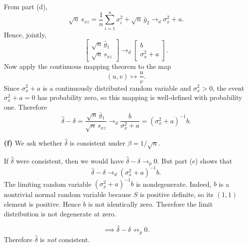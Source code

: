 \documentclass[12pt, letterpaper, onecolumn]{exam}
\begin{document}
\begin{solution}
    From part (d),
    $$
        \sqrt n\, s_{xz}
        =
        \frac1n\sum_{i=1}^n x_i^2+\sqrt n\,\bar g_2
        \to_d \sigma_x^2+a.
    $$
    Hence, jointly,
    $$
        \begin{bmatrix}
            \sqrt n\,\bar g_1 \\
            \sqrt n\, s_{xz}
        \end{bmatrix}
        \to_d
        \begin{bmatrix}
            b \\
            \sigma_x^2+a
        \end{bmatrix}.
    $$
    Now apply the continuous mapping theorem to the map
    $$
        (u,v)\mapsto \frac{u}{v}.
    $$
    Since \(\sigma_x^2+a\) is a continuously distributed random variable and \(\sigma_x^2>0\), the event \(\sigma_x^2+a=0\) has probability zero, so this mapping is well-defined with probability one. Therefore
    $$
        \hat\delta-\delta
        =
        \frac{\sqrt n\,\bar g_1}{\sqrt n\, s_{xz}}
        \to_d
        \frac{b}{\sigma_x^2+a}
        =
        (\sigma_x^2+a)^{-1}b.
    $$

    \textbf{(f)} We ask whether \(\hat\delta\) is consistent under \(\beta=1/\sqrt n\).

    If \(\hat\delta\) were consistent, then we would have $\hat\delta-\delta\to_p 0.$
    But part (e) shows that
    $$
        \hat\delta-\delta\to_d (\sigma_x^2+a)^{-1}b.
    $$
    The limiting random variable \((\sigma_x^2+a)^{-1}b\) is nondegenerate. Indeed, \(b\) is a nontrivial normal random variable because \(S\) is positive definite, so its \((1,1)\) element is positive. Hence \(b\) is not identically zero. Therefore the limit distribution is not degenerate at zero.

    $$
        \implies
        \hat\delta-\delta \not\to_p 0.
    $$
    Therefore \(\hat\delta\) is \emph{not} consistent.

\end{solution}
\end{document}
